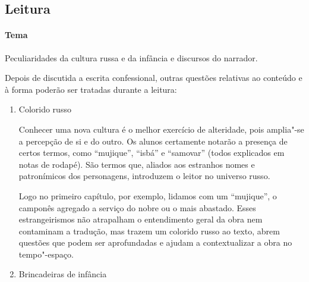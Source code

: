 \documentclass{article}
\begin{document}
\subsection{Leitura}

\paragraph{Tema} Peculiaridades da cultura russa e da infância e
discursos do narrador.

Depois de discutida a escrita confessional, outras questões relativas ao
conteúdo e à forma poderão ser tratadas durante a leitura:

\begin{enumerate}
\item
Colorido russo

Conhecer uma nova cultura é o melhor exercício de alteridade, pois
amplia"-se a percepção de si e do outro. Os alunos certamente notarão a
presença de certos termos, como ``mujique'', ``isbá'' e ``samovar''
(todos explicados em notas de rodapé). São termos que, aliados aos
estranhos nomes e patronímicos dos personagens, introduzem o leitor no
universo russo.


Logo no primeiro capítulo, por exemplo, lidamos com um ``mujique'', o
camponês agregado a serviço do nobre ou o mais abastado. Esses
estrangeirismos não atrapalham o entendimento geral da obra nem
contaminam a tradução, mas trazem um colorido russo ao texto, abrem
questões que podem ser aprofundadas e ajudam a contextualizar a obra no
tempo"-espaço.


\item
Brincadeiras de infância


\end{enumerate}
\end{document}
